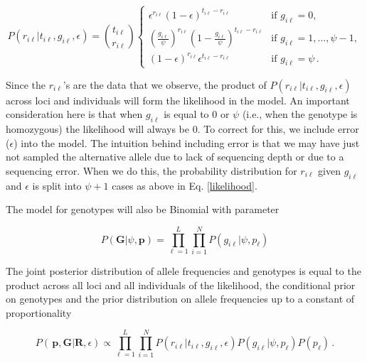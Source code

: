 \documentclass[11pt,english,letterpaper,oneside]{article}
\begin{document}
\begin{equation}\label{likelihood}
{P}(r_{i \ell}|t_{i\ell}, g_{i \ell},\epsilon) = \binom{t_{i \ell}}{r_{i \ell}}
	\begin{cases}
	\epsilon^{r_{i \ell}}(1-\epsilon)^{t_{i \ell}-r_{i \ell}} & \text{if  } g_{i \ell} = 0, \\[0.05in]
	\left(\frac{g_{i \ell}}{\psi}\right)^{r_{i \ell}}\left(1-\frac{g_{i \ell}}{\psi}\right)^{t_{i \ell}-r_{i \ell}} & \text{if  } g_{i \ell} = 1,\ldots,\psi-1, \\[0.05in]
	(1-\epsilon)^{r_{i \ell}}\epsilon^{t_{i \ell}-r_{i \ell}} & \text{if  } g_{i \ell} = \psi\,.
	\end{cases}
\end{equation}


\noindent Since the $r_{i \ell}$'s are the data that we observe, the product of $P(r_{i \ell}|t_{i\ell}, g_{i \ell},\epsilon)$ across loci and individuals will form the likelihood in the model. An important consideration here is that when $g_{i \ell}$ is equal to 0 or $\psi$ (i.e., when the genotype is homozygous) the likelihood will always be 0. To correct for this, we include error ($\epsilon$) into the model. The intuition behind including error is that we may have just not sampled the alternative allele due to lack of sequencing depth or due to a sequencing error. When we do this, the probability distribution for $r_{i\ell}$ given $g_{i\ell}$ and $\epsilon$ is split into $\psi+1$ cases as above in Eq. \ref{likelihood}.


The model for genotypes will also be Binomial with parameter

\begin{equation}\label{condl_prior}
P(\bm{G}|\psi, \bm{p}) = \displaystyle\prod_{\ell=1}^L\displaystyle\prod_{i=1}^N P(g_{i \ell}|\psi, p_{\ell})
\end{equation}

The joint posterior distribution of allele frequencies and genotypes is equal to the product across all loci and all individuals of the likelihood, the conditional prior on genotypes and the prior distribution on allele frequencies up to a constant of proportionality

\begin{equation}\label{posterior}
{P}(\,\bm{p},\bm{G}|\bm{R},\epsilon) \propto \displaystyle\prod_{\ell=1}^L\displaystyle\prod_{i=1}^N {P}(r_{i \ell}|t_{i\ell}, g_{i \ell},\epsilon){P}(g_{i \ell}|\psi, p_{\ell}){P}(p_{\ell})\,.
\end{equation}
\end{document}

